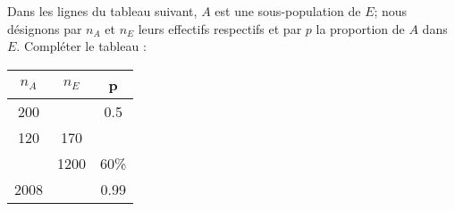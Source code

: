 
\begin{exercice}\label{exoPremiere-0012}

    Dans les lignes du tableau suivant, \( A\) est une sous-population de \( E\); nous désignons par \( n_A\) et \( n_E\) leurs effectifs respectifs et par \( p\) la proportion de \( A\) dans \( E\). Compléter le tableau :
    \begin{tabular}{|c|c|c|}
        \hline
        \( n_A\)&\( n_E\)&p\\
        \hline
        200&&0.5\\
        120&170\\
        &1200&60\%\\
        2008&&0.99
    \end{tabular}

\end{exercice}
